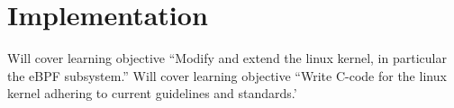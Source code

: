 \section{Implementation}
\label{sec:implementation}

Will cover learning objective ``Modify and extend the linux kernel, in particular the eBPF subsystem.''
Will cover learning objective ``Write C-code for the linux kernel adhering to current guidelines and standards.'